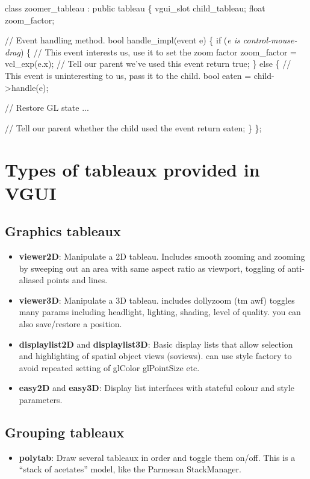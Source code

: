 \documentclass[12pt]{report} \usepackage{epsfig}
\begin{document}
{\scriptsize \begin{verbawf}
  class zoomer\_tableau : public tableau
  \{
    vgui_slot child_tableau;
    float zoom\_factor;

    // Event handling method.
    bool handle\_impl(event e)
    \{
      if ({\em e is control-mouse-drag})
      \{
        //  This event interests us, use it to set the zoom factor
        zoom\_factor = vcl_exp(e.x);
        //  Tell our parent we've used this event
        return true;
      \}
      else
      \{
        //  This event is uninteresting to us, pass it to the child.
        bool eaten = child->handle(e);

        //  Restore GL state
        ...

        //  Tell our parent whether the child used the event
        return eaten;
      \}
  \};
\end{verbawf}}


\section{Types of tableaux provided in VGUI}

\subsection{Graphics tableaux}
\begin{itemize}
\item {\bf viewer2D}:  Manipulate a 2D tableau. Includes smooth zooming and zooming by
            sweeping out an area with same aspect ratio as viewport,
            toggling of anti-aliased points and lines.
\item {\bf viewer3D}: Manipulate a 3D tableau. includes dollyzoom (tm awf) toggles
            many params including headlight, lighting, shading, level of
            quality. you can also save/restore a position.
\item {\bf displaylist2D} and {\bf displaylist3D}: Basic display lists that allow selection
      and highlighting of spatial object views (soviews). can use style factory to avoid
      repeated setting of glColor glPointSize etc.
\item {\bf easy2D} and {\bf easy3D}: Display list interfaces with stateful colour and style
      parameters.
\end{itemize}

\subsection{Grouping tableaux}
\begin{itemize}
\item {\bf polytab}: Draw several tableaux in order and toggle them on/off.  This is
      a ``stack of acetates'' model, like the Parmesan StackManager.
\end{itemize}
\end{document}
